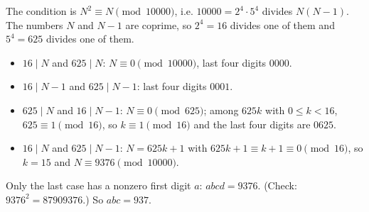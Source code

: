 The condition is $N^2\equiv N\pmod{10000}$, i.e. $10000=2^4\cdot5^4$ divides $N(N-1)$. The numbers $N$ and $N-1$ are coprime, so $2^4=16$ divides one of them and $5^4=625$ divides one of them.
\begin{itemize}
\item $16\mid N$ and $625\mid N$: $N\equiv0\pmod{10000}$, last four digits $0000$.
\item $16\mid N-1$ and $625\mid N-1$: last four digits $0001$.
\item $625\mid N$ and $16\mid N-1$: $N\equiv0\pmod{625}$; among $625k$ with $0\le k<16$, $625\equiv1\pmod{16}$, so $k\equiv1\pmod{16}$ and the last four digits are $0625$.
\item $16\mid N$ and $625\mid N-1$: $N=625k+1$ with $625k+1\equiv k+1\equiv0\pmod{16}$, so $k=15$ and $N\equiv9376\pmod{10000}$.
\end{itemize}
Only the last case has a nonzero first digit $a$: $abcd=9376$. (Check: $9376^2=87909376$.) So $abc=\boxed{937}$.
